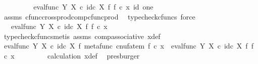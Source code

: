\begin{isabellebody}
\ \ \ \ \isamarkupfalse%
\ \isamarkupfalse%
\ {\isachardoublequoteopen}{\isachardot}{\kern0pt}{\isachardot}{\kern0pt}{\isachardot}{\kern0pt}\ {\isacharequal}{\kern0pt}\ eval{\isacharunderscore}{\kern0pt}func\ Y\ X\ {\isasymcirc}\isactrlsub c\ {\isacharparenleft}{\kern0pt}id\isactrlsub c\ X\ {\isasymtimes}\isactrlsub f\ f{\isacharparenright}{\kern0pt}\ {\isasymcirc}\isactrlsub c\ {\isasymlangle}x{\isacharcomma}{\kern0pt}\ id\ one{\isasymrangle}{\isachardoublequoteclose}\isanewline
\ \ \ \ \ \ \isamarkupfalse%
\ assms\ cfunc{\isacharunderscore}{\kern0pt}cross{\isacharunderscore}{\kern0pt}prod{\isacharunderscore}{\kern0pt}comp{\isacharunderscore}{\kern0pt}cfunc{\isacharunderscore}{\kern0pt}prod\ \isamarkupfalse%
\ {\isacharparenleft}{\kern0pt}typecheck{\isacharunderscore}{\kern0pt}cfuncs{\isacharcomma}{\kern0pt}\ force{\isacharparenright}{\kern0pt}\isanewline
\ \ \ \ \isamarkupfalse%
\ \isamarkupfalse%
\ {\isachardoublequoteopen}{\isachardot}{\kern0pt}{\isachardot}{\kern0pt}{\isachardot}{\kern0pt}\ {\isacharequal}{\kern0pt}\ {\isacharparenleft}{\kern0pt}eval{\isacharunderscore}{\kern0pt}func\ Y\ X\ {\isasymcirc}\isactrlsub c\ id\isactrlsub c\ X\ {\isasymtimes}\isactrlsub f\ f{\isacharparenright}{\kern0pt}\ {\isasymcirc}\isactrlsub c\ x{}{\isachardoublequoteclose}\isanewline
\ \ \ \ \ \ \isamarkupfalse%
\ {\isacharparenleft}{\kern0pt}typecheck{\isacharunderscore}{\kern0pt}cfuncs{\isacharcomma}{\kern0pt}metis\ assms\ comp{\isacharunderscore}{\kern0pt}associative{}\ x{\isacharunderscore}{\kern0pt}def{\isacharparenright}{\kern0pt}\isanewline
\ \ \ \ \isamarkupfalse%
\ \isamarkupfalse%
\ {\isachardoublequoteopen}{\isacharparenleft}{\kern0pt}eval{\isacharunderscore}{\kern0pt}func\ Y\ X\ {\isasymcirc}\isactrlsub c\ id\isactrlsub c\ X\ {\isasymtimes}\isactrlsub f\ metafunc\ {\isacharparenleft}{\kern0pt}cnufatem\ f{\isacharparenright}{\kern0pt}{\isacharparenright}{\kern0pt}\ {\isasymcirc}\isactrlsub c\ x{}\ {\isacharequal}{\kern0pt}\ {\isacharparenleft}{\kern0pt}eval{\isacharunderscore}{\kern0pt}func\ Y\ X\ {\isasymcirc}\isactrlsub c\ id\isactrlsub c\ X\ {\isasymtimes}\isactrlsub f\ f{\isacharparenright}{\kern0pt}\ {\isasymcirc}\isactrlsub c\ x{}{\isachardoublequoteclose}\isanewline
\ \ \ \ \ \ \isamarkupfalse%
\ \ calculation\ x{\isacharunderscore}{\kern0pt}def\ \isamarkupfalse%
\ presburger\isanewline
\ \ \isamarkupfalse%

\end{isabellebody}
